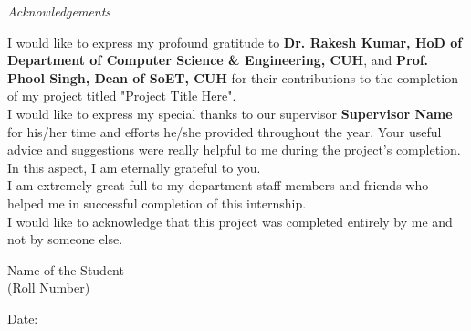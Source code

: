 \newpage

\begin{center}
\emph{\LARGE Acknowledgements}\\[2.5cm]
\end{center}
\normalsize 

I would like to express my profound gratitude to \textbf{Dr. Rakesh Kumar, HoD of Department of Computer Science \& Engineering, CUH}, and \textbf{Prof. Phool Singh, Dean of SoET, CUH} for their contributions to the completion of my project titled "Project Title Here".\\

I would like to express my special thanks to our supervisor \textbf{Supervisor Name} for his/her time and efforts he/she provided throughout the year. Your useful advice and suggestions were really helpful to me during the project’s completion. In this aspect, I am eternally grateful to you.\\

I am extremely great full to my department staff members and friends who helped me in successful completion of this internship.\\

I would like to acknowledge that this project was completed entirely by me and not by someone else.

\vfill
\begin{flushright}
Name of the Student\\
(Roll Number)
\end{flushright}

\begin{flushleft}
Date: 
\end{flushleft}
\newpage
